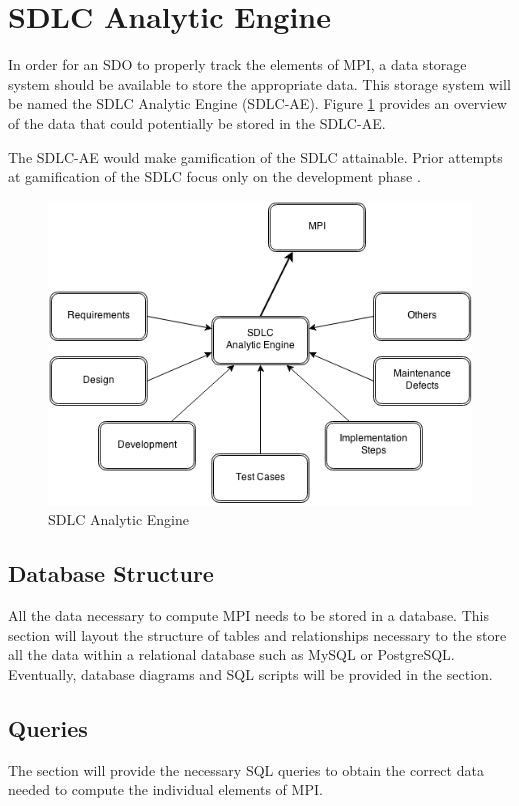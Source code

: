 \documentclass[SDSUThesis.tex]{subfiles}
\begin{document}
\section{SDLC Analytic Engine}

In order for an SDO to properly track the elements of MPI, a data storage system should be available to store the appropriate data.   This storage system will be named the SDLC Analytic Engine (SDLC-AE). Figure \ref{fig:sdlc-ae} provides an overview of the data that could potentially be stored in the SDLC-AE.

The SDLC-AE would make gamification of the SDLC attainable.  Prior attempts
at gamification of the SDLC focus only on the development phase \cite{Dubois2013} \cite{Snipes2013}.

\begin{figure}[ht]
\includegraphics[scale=.7]{sdlc-ae.png}
\caption{SDLC Analytic Engine}
\label{fig:sdlc-ae}
\end{figure}

\subsection{Database Structure}
   All the data necessary to compute MPI needs to be stored in a database.  This section will 
   layout the structure of tables and relationships necessary to the store all the data
   within a relational database such as MySQL or PostgreSQL.  Eventually,
   database diagrams and SQL scripts will be provided in the section.

\subsection{Queries}
    The section will provide the necessary SQL queries to obtain the correct data
    needed to compute the individual elements of MPI.
    
\end{document}
